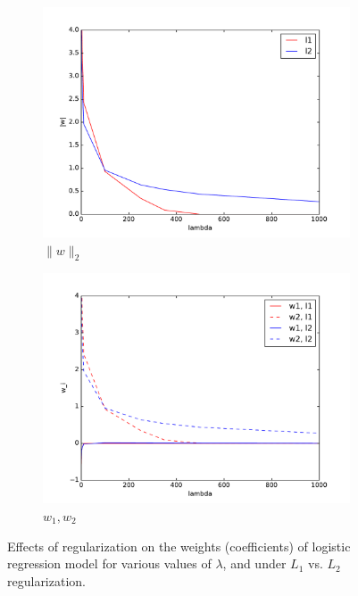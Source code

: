 \documentclass[10pt,psamsfonts]{amsart}
\theoremstyle{definition}
\theoremstyle{remark}
\numberwithin{equation}{section}
\begin{document}
\begin{figure}[b]
\begin{subfigure}[b]{0.23\textwidth}
		\includegraphics[width=\textwidth]{hw2_1-2_2.pdf}
		\caption{$\|w\|_2$}
	\end{subfigure}
	\begin{subfigure}[b]{0.23\textwidth}
		\includegraphics[width=\textwidth]{hw2_1-2_3.pdf}
		\caption{$w_1, w_2$}
	\end{subfigure}
	\caption{Effects of regularization on the weights (coefficients) of logistic regression model for various values of $\lambda$, and under $L_1$ vs. $L_2$ regularization.}
\end{figure}
\end{document}
